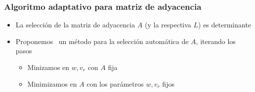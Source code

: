 \documentclass[aspectratio=43,spanish]{beamer}
\newcommand{\myvec}[1]{\bm{#1}}
\newcommand{\fv}[1]{\myvec{#1}}
\newcommand{\ntasks}{T}
\begin{document}
\begin{frame}
      \frametitle{Algoritmo adaptativo para matriz de adyacencia}

      \begin{itemize}
            \item La selección de la matriz de adyacencia $A$ (y la respectiva $L$) es determinante
            \item Proponemos~ un método para la selección automática de $A$, iterando los pasos
            
            \begin{itemize}
                  \item Minizamos en $w, {v_r}$ con $A$ fija
                  \item Minimizamos en $A$ con los parámetros $w, v_r$ fijos
            \end{itemize}
      \end{itemize}

\end{frame}
\end{document}
